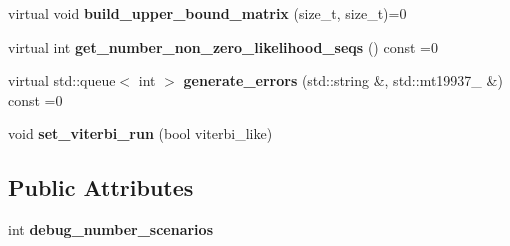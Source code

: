 \begin{DoxyCompactItemize}
\item 
\mbox{\label{classError__rate_a5ee5de524e97762d18b33d48f5bb82ad}} 
virtual void {\bfseries build\+\_\+upper\+\_\+bound\+\_\+matrix} (size\+\_\+t, size\+\_\+t)=0
\item 
\mbox{\label{classError__rate_a8f8fb2d0d60985a660070e5b523d4139}} 
virtual int {\bfseries get\+\_\+number\+\_\+non\+\_\+zero\+\_\+likelihood\+\_\+seqs} () const =0
\item 
\mbox{\label{classError__rate_acb786947d2b19bee160e49e37d87f2f6}} 
virtual std\+::queue$<$ int $>$ {\bfseries generate\+\_\+errors} (std\+::string \&, std\+::mt19937\+\_ \&) const =0
\item 
\mbox{\label{classError__rate_aaf23376c6c60b95f7b4a798dd0b28691}} 
void {\bfseries set\+\_\+viterbi\+\_\+run} (bool viterbi\+\_\+like)
\end{DoxyCompactItemize}
\subsection*{Public Attributes}
\begin{DoxyCompactItemize}
\item 
\mbox{\label{classError__rate_a332b99f1f3ff28228f552297cbbb471e}} 
int {\bfseries debug\+\_\+number\+\_\+scenarios}
\end{DoxyCompactItemize}
